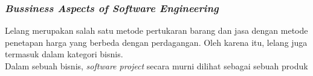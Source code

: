 \subsubsection{\textit{Bussiness Aspects of Software Engineering}}
	
	Lelang merupakan salah satu metode pertukaran barang dan jasa dengan metode penetapan harga yang berbeda dengan perdagangan. Oleh karena itu, lelang juga termasuk dalam kategori bisnis.\\
	\indent Dalam sebuah bisnis, \textit{software project} secara murni dilihat sebagai sebuah produk